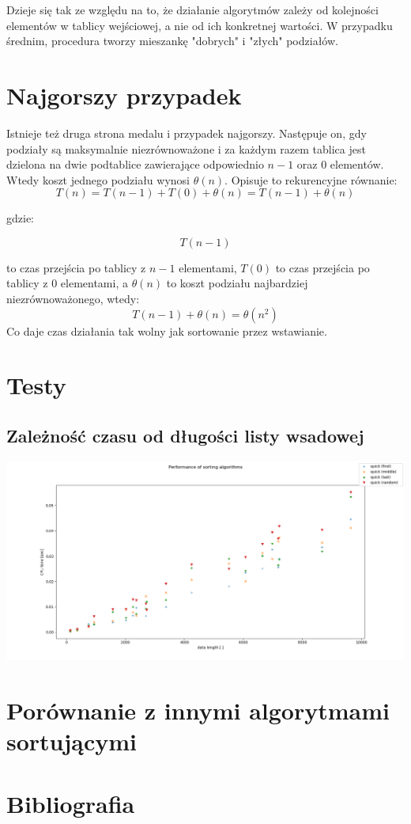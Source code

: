 \documentclass[a4paper,11pt]{report}
\begin{document}
Dzieje się tak ze względu na to, że działanie algorytmów zależy od kolejności elementów w tablicy wejściowej, a nie od ich konkretnej wartości. W przypadku średnim, procedura tworzy mieszankę "dobrych" i "złych" podziałów.

\section{Najgorszy przypadek}
Istnieje też druga strona medalu i przypadek najgorszy. Następuje on, gdy podziały są maksymalnie niezrównoważone i za każdym razem tablica jest dzielona na dwie podtablice zawierające odpowiednio $n-1$ oraz 0 elementów. Wtedy koszt jednego podziału wynosi $\theta (n)$. Opisuje to rekurencyjne równanie:
\begin{equation*}
T(n) = T(n-1) + T(0) + \theta(n) = T(n-1) + \theta(n)
\end{equation*}

gdzie:

\begin{equation*}
T(n-1)
\end{equation*}

to czas przejścia po tablicy z $n-1$ elementami, $T(0)$ to czas przejścia po tablicy z 0 elementami, a $\theta(n)$ to koszt podziału najbardziej niezrównoważonego, wtedy:
\begin{equation*}
T(n-1) + \theta(n) = \theta(n^2)
\end{equation*}
Co daje czas działania tak wolny jak sortowanie przez wstawianie.

\section{Testy}
\subsection{Zależność czasu od długości listy wsadowej}
\begin{flushleft}
\includegraphics[scale=0.5]{data_length.png}
\end{flushleft}


\section{Porównanie z innymi algorytmami sortującymi}
\section{Bibliografia}

\nocite{*}


\end{document}
